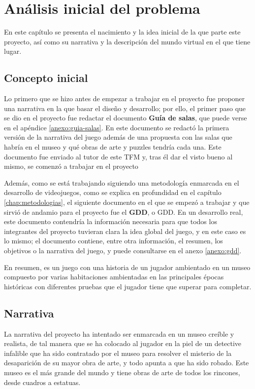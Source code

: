 \chapter{Análisis inicial del problema}
\label{chap:analisis_problema}

En este capítulo se presenta el nacimiento y la idea inicial de la que parte este proyecto, así como su narrativa y la descripción del mundo virtual en el que tiene lugar.

\section{Concepto inicial}

Lo primero que se hizo antes de empezar a trabajar en el proyecto fue proponer una narrativa en la que basar el diseño y desarrollo; por ello, el primer paso que se dio en el proyecto fue redactar el documento \textbf{Guía de salas}, que puede verse en el apéndice \ref{anexo:guia-salas}. En este documento se redactó la primera versión de la narrativa del juego además de una propuesta con las salas que habría en el museo y qué obras de arte y puzzles tendría cada una. Este documento  fue enviado al tutor de este \acs{TFM} y, tras él dar el visto bueno al mismo, se comenzó a trabajar en el proyecto

Además, como se está trabajando siguiendo una metodología enmarcada en el desarrollo de videojuegos, como se explica en profundidad en el capítulo \ref{chap:metodologias}, el siguiente documento en el que se empezó a trabajar y que sirvió de andamio para el proyecto fue el \textbf{\acl{GDD}}, o \acs{GDD}. En un desarrollo real, este documento contendría la información necesaria para que todos los integrantes del proyecto tuvieran clara la idea global del juego, y en este caso es lo mismo; el documento contiene, entre otra información, el resumen, los objetivos o la narrativa del juego, y puede consultarse en el anexo \ref{anexo:gdd}.

En resumen, \MineRVa es un juego con una historia de un jugador ambientado en un museo compuesto por varias habitaciones ambientadas en las principales épocas históricas con diferentes pruebas que el jugador tiene que superar para completar.

\section{Narrativa}

La narrativa del proyecto ha intentado ser enmarcada en un museo creíble y realista, de tal manera que se ha colocado al jugador en la piel de un detective infalible que ha sido contratado por el museo para resolver el misterio de la desaparición de su mayor obra de arte, y todo apunta a que ha sido robado. Este museo es el más grande del mundo y tiene obras de arte de todos los rincones, desde cuadros a estatuas.


